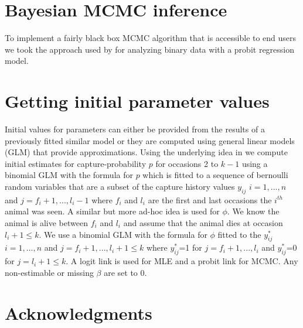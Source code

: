 \documentclass[12pt]{article}
\begin{document}
\section*{Bayesian MCMC inference}

To implement a fairly \textquotedbl{}black box\textquotedbl{} MCMC
algorithm that is accessible to end users we took the approach used
by \citet{ALBERT:1993fk} for analyzing binary data with a probit
regression model.


\section*{Getting initial parameter values}

Initial values for parameters can either be provided from the results
of a previously fitted similar model or they are computed using general
linear models (GLM) that provide approximations. Using the underlying
idea in \citet{Manly1968} we compute initial estimates for capture-probability
$p$ for occasions 2 to $k-1$ using a binomial GLM with the formula
for $p$ which is fitted to a sequence of bernoulli random variables
that are a subset of the capture history values $y_{ij}$ $i=1,...,n$
and $j=f_{i}+1,...,l_{i}-1$ where $f_{i}$ and $l_{i}$ are the first
and last occasions the $i^{th}$ animal was seen. A similar but more
ad-hoc idea is used for $\phi$. We know the animal is alive between
$f_{i}$ and $l_{i}$ and assume that the animal dies at occasion
$l_{i}+1\leq k$. We use a binomial GLM with the formula for $\phi$
fitted to the $y_{ij}^{*}$ $i=1,...,n$ and $j=f_{i}+1,...,l_{i}+1\leq k$
where $y_{ij}^{*}$=1 for $j=f_{i}+1,...,l_{i}$ and $y_{ij}^{*}$=0
for $j=l_{i}+1\leq k$. A logit link is used for MLE and a probit
link for MCMC. Any non-estimable or missing $\beta$ are set to 0. 


\section*{Acknowledgments}


\end{document}

